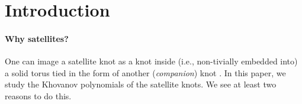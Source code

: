\documentclass[11pt]{article}
\begin{document}
\begin{abstract}
	We compute explicitly the Khovanov polynomials (using the computer program from katlas.org) for the two
	simplest families of the satellite knots, which are the twisted Whitehead doubles and the two-strand cables.
	We find that a quantum group decomposition for the HOMFLY polynomial of a satellite knot
	can be extended to the Khovanov polynomial, whose quantum group properties are not manifest. Namely, the Khovanov polynomial of a twisted Whitehead
	double or two-strand cable (the two simplest satellite families) can be presented as a naively
	deformed linear combination of the pattern and companion invariants.
	For a given companion, the satellite polynomial ``smoothly'' depends on the pattern but for the ``jump'' at one critical point defined by the $s$-invariant of the companion knot. %
A similar phenomenon is known for the knot Floer homology and $\tau$-invariant for the same kind of satellites %
	
\end{abstract}

\tableofcontents

\section{Introduction\label{sec:int}}




\paragraph{Why satellites?}
One can image a satellite knot as a knot inside (i.e., non-tivially embedded into) a solid torus tied in the form of another (\textit{companion}) knot \cite{KnotBook}. In this paper, we study the Khovanov polynomials of the satellite knots. We see at least two reasons to do this.
\end{document}
